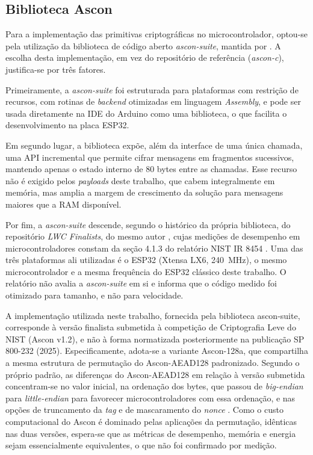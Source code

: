 \subsection{Biblioteca Ascon}
\label{subsec:biblioteca-ascon}
Para a implementação das primitivas criptográficas no microcontrolador, optou-se pela utilização da biblioteca de código aberto \textit{ascon-suite}, mantida por . A escolha desta implementação, em vez do repositório de referência (\textit{ascon-c}), justifica-se por três fatores.

Primeiramente, a \textit{ascon-suite} foi estruturada para plataformas com restrição de recursos, com rotinas de \textit{backend} otimizadas em linguagem \textit{Assembly}, e pode ser usada diretamente na IDE do Arduino como uma biblioteca, o que facilita o desenvolvimento na placa ESP32.

Em segundo lugar, a biblioteca expõe, além da interface de uma única chamada, uma API incremental que permite cifrar mensagens em fragmentos sucessivos, mantendo apenas o estado interno de 80 bytes entre as chamadas. Esse recurso não é exigido pelos \textit{payloads} deste trabalho, que cabem integralmente em memória, mas amplia a margem de crescimento da solução para mensagens maiores que a RAM disponível.

Por fim, a \textit{ascon-suite} descende, segundo o histórico da própria biblioteca, do repositório \textit{LWC Finalists}, do mesmo autor \cite{weatherley2023ascon}, cujas medições de desempenho em microcontroladores constam da seção 4.1.3 do relatório NIST IR 8454 \cite{nistir8454}. Uma das três plataformas ali utilizadas é o ESP32 (Xtensa LX6, 240~MHz), o mesmo microcontrolador e a mesma frequência do ESP32 clássico deste trabalho. O relatório não avalia a \textit{ascon-suite} em si e informa que o código medido foi otimizado para tamanho, e não para velocidade.

A implementação utilizada neste trabalho, fornecida pela biblioteca ascon-suite, corresponde à versão finalista submetida à competição de Criptografia Leve do NIST (Ascon v1.2), e não à forma normatizada posteriormente na publicação SP 800-232 (2025). Especificamente, adota-se a variante Ascon-128a, que compartilha a mesma estrutura de permutação do Ascon-AEAD128 padronizado. Segundo o próprio padrão, as diferenças do Ascon-AEAD128 em relação à versão submetida concentram-se no valor inicial, na ordenação dos bytes, que passou de \textit{big-endian} para \textit{little-endian} para favorecer microcontroladores com essa ordenação, e nas opções de truncamento da \textit{tag} e de mascaramento do \textit{nonce} \cite{nist800232}. Como o custo computacional do Ascon é dominado pelas aplicações da permutação, idênticas nas duas versões, espera-se que as métricas de desempenho, memória e energia sejam essencialmente equivalentes, o que não foi confirmado por medição.

